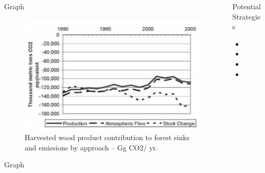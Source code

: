 \documentclass[final]{beamer}\usepackage[]{graphicx}\usepackage[]{color}
\begin{document}
\begin{frame}[fragile]
\begin{columns}[t]
\begin{column}{0.23\linewidth}
\begin{minipage}[t][.955\textheight]{\linewidth}
\vspace{0ex}
\begin{block}{Graph}
\vspace{0ex}
\begin{figure}
  \includegraphics[width=\linewidth]{graph1.png}
  \caption{Harvested wood product contribution to forest sinks and emissions by approach – Gg CO2/ yr.}
  \label{Figure 1}
\end{figure}
\vspace{0ex}
\end{block}
\vfill

\vspace{0ex}
\begin{block}{Graph}
\vspace{0ex}

\vspace{0ex}
\end{block}
\vfill

\end{minipage}
\end{column}%

\begin{column}{0.23\linewidth}
\begin{minipage}[t][.955\textheight]{\linewidth} 

\vspace{0ex}
\begin{block}{Potential Strategies}
\vspace{0ex}
\begin{itemize}
\item
\item
\item
\item
\end{itemize}
\vspace{0ex}
\vfill
\end{block}
\vfill


\end{minipage}
\end{column}
\end{columns}
\end{frame}
\end{document}
